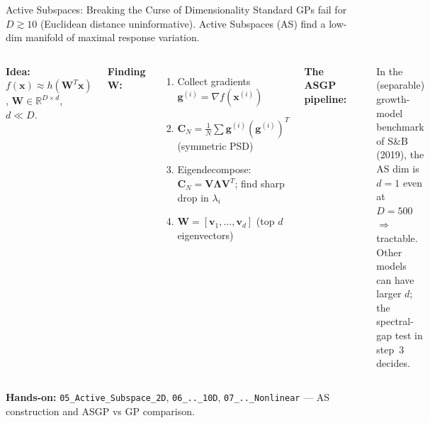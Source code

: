 \documentclass[aspectratio=169,11pt]{beamer}
\newcommand{\emphc}[1]{\textcolor{harvardcrimson}{#1}}
\newcommand{\x}{\bm{x}}
\newcommand{\z}{\bm{z}}
\newcommand{\W}{\bm{W}}
\newcommand{\R}{\mathbb{R}}
\begin{document}
\begin{frame}{Active Subspaces: Breaking the Curse of Dimensionality}
\scriptsize
Standard GPs fail for $D \gtrsim 10$ (Euclidean distance uninformative). \emphc{Active Subspaces} (AS) find a low-dim manifold of maximal response variation.

\vspace{0.2em}
\begin{columns}[T]
\textbf{Idea:} $f(\x) \approx h(\W^T\x)$, $\W \in \R^{D \times d}$, $d \ll D$.

\vspace{0.2em}
\textbf{Finding $\W$:}
\begin{enumerate}\itemsep0pt
    \item Collect gradients $\bm{g}^{(i)} = \nabla f(\x^{(i)})$
    \item $\bm{C}_N = \frac{1}{N}\sum \bm{g}^{(i)} (\bm{g}^{(i)})^T$ (symmetric PSD)
    \item Eigendecompose: $\bm{C}_N = \bm{V}\bm{\Lambda}\bm{V}^T$; find \emphc{sharp drop} in $\lambda_i$
    \item $\W = [\bm{v}_1, \ldots, \bm{v}_d]$ (top $d$ eigenvectors)
\end{enumerate}

\textbf{The ASGP pipeline:}

\vspace{0.3em}
\begin{center}
\end{center}

\vspace{0.2em}
In the (separable) growth-model benchmark of S\&B (2019), the AS dim is $d = 1$ even at $D = 500$ $\Rightarrow$ tractable. Other models can have larger $d$; the spectral-gap test in step~3 decides.
\end{columns}

\vspace{0.1em}
{\tiny \textbf{Hands-on:} \texttt{05\_Active\_Subspace\_2D}, \texttt{06\_..\_10D}, \texttt{07\_..\_Nonlinear} --- AS construction and ASGP vs GP comparison.}
\end{frame}
\end{document}
